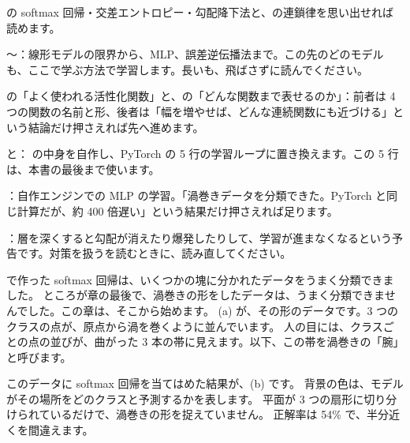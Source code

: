 \begin{readingguide}
\item[\rgpre] の softmax 回帰・交差エントロピー・勾配降下法と、の連鎖律を思い出せれば読めます。
\item[\rgmust] 〜：線形モデルの限界から、MLP、誤差逆伝播法まで。この先のどのモデルも、ここで学ぶ方法で学習します。長いも、飛ばさずに読んでください。
\item[\rgskim] の「よく使われる活性化関数」と、の「どんな関数まで表せるのか」：前者は 4 つの関数の名前と形、後者は「幅を増やせば、どんな連続関数にも近づける」という結論だけ押さえれば先へ進めます。
\item[\rgmust] と： の中身を自作し、PyTorch の 5 行の学習ループに置き換えます。この 5 行は、本書の最後まで使います。
\item[\rgskim] ：自作エンジンでの MLP の学習。「渦巻きデータを分類できた。PyTorch と同じ計算だが、約 400 倍遅い」という結果だけ押さえれば足ります。
\item[\rgskim] ：層を深くすると勾配が消えたり爆発したりして、学習が進まなくなるという予告です。対策を扱うを読むときに、読み直してください。
\end{readingguide}

で作った softmax 回帰は、いくつかの塊に分かれたデータをうまく分類できました。
ところが章の最後で、渦巻きの形をしたデータは、うまく分類できませんでした。この章は、そこから始めます。
(a) が、その形のデータです。3 つのクラスの点が、原点から渦を巻くように並んでいます。
人の目には、クラスごとの点の並びが、曲がった 3 本の帯に見えます。以下、この帯を渦巻きの「腕」と呼びます。

このデータに softmax 回帰を当てはめた結果が、(b) です。
背景の色は、モデルがその場所をどのクラスと予測するかを表します。
平面が 3 つの扇形に切り分けられているだけで、渦巻きの形を捉えていません。
正解率は 54\% で、半分近くを間違えます。


